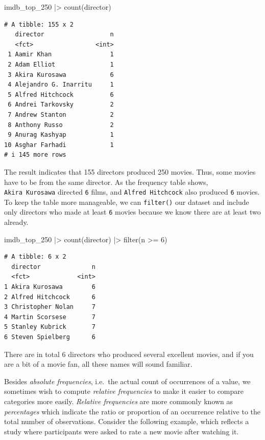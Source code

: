 \documentclass[
  letterpaper,
]{krantz}
\makeatletter
\newenvironment{Shaded}{\begin{snugshade}}{\end{snugshade}}
\newcommand{\DecValTok}[1]{\textcolor[rgb]{0.68,0.00,0.00}{#1}}
\newcommand{\FunctionTok}[1]{\textcolor[rgb]{0.28,0.35,0.67}{#1}}
\newcommand{\NormalTok}[1]{\textcolor[rgb]{0.00,0.23,0.31}{#1}}
\newcommand{\SpecialCharTok}[1]{\textcolor[rgb]{0.37,0.37,0.37}{#1}}
\newenvironment{kframe}{%
\medskip{}
\setlength{\fboxsep}{.8em}
 \def\at@end@of@kframe{}%
 \ifinner\ifhmode%
  \def\at@end@of@kframe{\end{minipage}}%
  \begin{minipage}{\columnwidth}%
 \fi\fi%
 \def\FrameCommand##1{\hskip\@totalleftmargin \hskip-\fboxsep
 \colorbox{shadecolor}{##1}\hskip-\fboxsep
     \hskip-\linewidth \hskip-\@totalleftmargin \hskip\columnwidth}%
 \MakeFramed {\advance\hsize-\width
   \@totalleftmargin\z@ \linewidth\hsize
   \@setminipage}}%
 {\par\unskip\endMakeFramed%
 \at@end@of@kframe}
\renewenvironment{Shaded}{\begin{kframe}}{\end{kframe}}
\makeatother
\begin{document}
\begin{Shaded}
\begin{Highlighting}[]
\NormalTok{imdb\_top\_250 }\SpecialCharTok{|\textgreater{}} \FunctionTok{count}\NormalTok{(director)}
\end{Highlighting}
\end{Shaded}

\begin{verbatim}
# A tibble: 155 x 2
   director                  n
   <fct>                 <int>
 1 Aamir Khan                1
 2 Adam Elliot               1
 3 Akira Kurosawa            6
 4 Alejandro G. Inarritu     1
 5 Alfred Hitchcock          6
 6 Andrei Tarkovsky          2
 7 Andrew Stanton            2
 8 Anthony Russo             2
 9 Anurag Kashyap            1
10 Asghar Farhadi            1
# i 145 more rows
\end{verbatim}

The result indicates that 155 directors produced 250 movies. Thus, some
movies have to be from the same director. As the frequency table shows,
\texttt{Akira\ Kurosawa} directed \texttt{6} films, and
\texttt{Alfred\ Hitchcock} also produced \texttt{6} movies. To keep the
table more manageable, we can \texttt{filter()} our dataset and include
only directors who made at least \texttt{6} movies because we know there
are at least two already.

\begin{Shaded}
\begin{Highlighting}[]
\NormalTok{imdb\_top\_250 }\SpecialCharTok{|\textgreater{}}
  \FunctionTok{count}\NormalTok{(director) }\SpecialCharTok{|\textgreater{}}
  \FunctionTok{filter}\NormalTok{(n }\SpecialCharTok{\textgreater{}=} \DecValTok{6}\NormalTok{)}
\end{Highlighting}
\end{Shaded}

\begin{verbatim}
# A tibble: 6 x 2
  director              n
  <fct>             <int>
1 Akira Kurosawa        6
2 Alfred Hitchcock      6
3 Christopher Nolan     7
4 Martin Scorsese       7
5 Stanley Kubrick       7
6 Steven Spielberg      6
\end{verbatim}

There are in total 6 directors who produced several excellent movies,
and if you are a bit of a movie fan, all these names will sound
familiar.

Besides \emph{absolute frequencies}, i.e.~the actual count of
occurrences of a value, we sometimes wish to compute \emph{relative
frequencies} to make it easier to compare categories more easily.
\emph{Relative frequencies} are more commonly known as
\emph{percentages} which indicate the ratio or proportion of an
occurrence relative to the total number of observations. Consider the
following example, which reflects a study where participants were asked
to rate a new movie after watching it.
\end{document}
